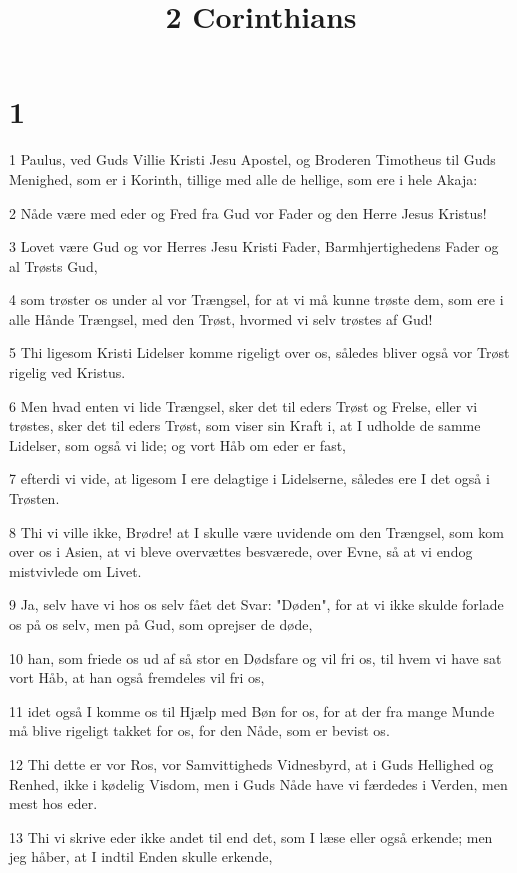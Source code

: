 

\title{2 Corinthians}


\chapter{1}

\par 1 Paulus, ved Guds Villie Kristi Jesu Apostel, og Broderen Timotheus til Guds Menighed, som er i Korinth, tillige med alle de hellige, som ere i hele Akaja:
\par 2 Nåde være med eder og Fred fra Gud vor Fader og den Herre Jesus Kristus!
\par 3 Lovet være Gud og vor Herres Jesu Kristi Fader, Barmhjertighedens Fader og al Trøsts Gud,
\par 4 som trøster os under al vor Trængsel, for at vi må kunne trøste dem, som ere i alle Hånde Trængsel, med den Trøst, hvormed vi selv trøstes af Gud!
\par 5 Thi ligesom Kristi Lidelser komme rigeligt over os, således bliver også vor Trøst rigelig ved Kristus.
\par 6 Men hvad enten vi lide Trængsel, sker det til eders Trøst og Frelse, eller vi trøstes, sker det til eders Trøst, som viser sin Kraft i, at I udholde de samme Lidelser, som også vi lide; og vort Håb om eder er fast,
\par 7 efterdi vi vide, at ligesom I ere delagtige i Lidelserne, således ere I det også i Trøsten.
\par 8 Thi vi ville ikke, Brødre! at I skulle være uvidende om den Trængsel, som kom over os i Asien, at vi bleve overvættes besværede, over Evne, så at vi endog mistvivlede om Livet.
\par 9 Ja, selv have vi hos os selv fået det Svar: "Døden", for at vi ikke skulde forlade os på os selv, men på Gud, som oprejser de døde,
\par 10 han, som friede os ud af så stor en Dødsfare og vil fri os, til hvem vi have sat vort Håb, at han også fremdeles vil fri os,
\par 11 idet også I komme os til Hjælp med Bøn for os, for at der fra mange Munde må blive rigeligt takket for os, for den Nåde, som er bevist os.
\par 12 Thi dette er vor Ros, vor Samvittigheds Vidnesbyrd, at i Guds Hellighed og Renhed, ikke i kødelig Visdom, men i Guds Nåde have vi færdedes i Verden, men mest hos eder.
\par 13 Thi vi skrive eder ikke andet til end det, som I læse eller også erkende; men jeg håber, at I indtil Enden skulle erkende,
